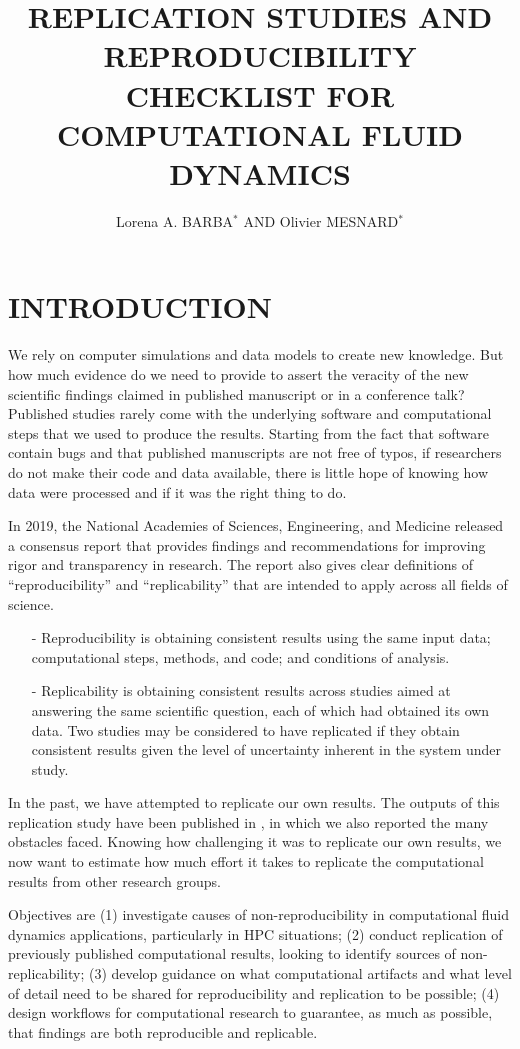 \documentclass{parcfd}
\title{REPLICATION STUDIES AND REPRODUCIBILITY CHECKLIST FOR COMPUTATIONAL FLUID DYNAMICS}
\author{Lorena A. BARBA$^{*}$ AND Olivier MESNARD$^{*}$}
\begin{document}

\section{INTRODUCTION}

We rely on computer simulations and data models to create new knowledge.
But how much evidence do we need to provide to assert the veracity of the new scientific findings claimed in published manuscript or in a conference talk?
Published studies rarely come with the underlying software and computational steps that we used to produce the results.
Starting from the fact that software contain bugs and that published manuscripts are not free of typos, if researchers do not make their code and data available, there is little hope of knowing how data were processed and if it was the right thing to do.

In 2019, the National Academies of Sciences, Engineering, and Medicine released a consensus report \cite{nasem_2019} that provides findings and recommendations for improving rigor and transparency in research.
The report also gives clear definitions of ``reproducibility'' and ``replicability'' that are intended to apply across all fields of science.

\begin{itemize}
    \item[-] Reproducibility is obtaining consistent results using the same input data; computational steps, methods, and code; and conditions of analysis.
    \item[-] Replicability is obtaining consistent results across studies aimed at answering the same scientific question, each of which had obtained its own data. Two studies may be considered to have replicated if they obtain consistent results given the level of uncertainty inherent in the system under study.
\end{itemize}

In the past, we have attempted to replicate our own results.
The outputs of this replication study have been published in \cite{mesnard_barba_2017}, in which we also reported the many obstacles faced.
Knowing how challenging it was to replicate our own results, we now want to estimate how much effort it takes to replicate the computational results from other research groups.

Objectives are (1) investigate causes of non-reproducibility in computational fluid dynamics applications, particularly in HPC situations; (2) conduct replication of previously published computational results, looking to identify sources of non-replicability; (3) develop guidance on what computational artifacts and what level of detail need to be shared for reproducibility and replication to be possible; (4) design workflows for computational research to guarantee, as much as possible, that findings are both reproducible and replicable.
\end{document}
